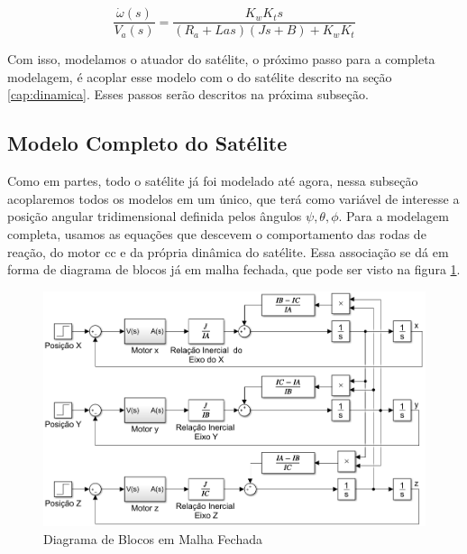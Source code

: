 \begin{equation}\label{eq:motor_accel}
  \frac{\dot{\omega}(s)}{V_a(s)} = \frac{K_wK_t s}{(R_a+ Las)(Js+B)+K_wK_t}  
\end{equation}

Com isso, modelamos o atuador do satélite, o próximo passo para a completa modelagem, é acoplar esse modelo com o do satélite descrito na seção \ref{cap:dinamica}. Esses passos serão descritos na próxima subseção.



\subsection{Modelo Completo do Satélite}

Como em partes, todo o satélite já foi modelado até agora, nessa subseção acoplaremos todos os modelos em um único, que terá como variável de interesse a posição angular tridimensional definida pelos ângulos $\psi, \theta, \phi$. Para a modelagem completa, usamos as equações que descevem o comportamento das rodas de reação, do motor cc e da própria dinâmica do satélite. Essa associação se dá em forma de diagrama de blocos já em malha fechada, que pode ser visto na figura \ref{fig:simulink_modelo_completo_aberto}.

\begin{figure}[H]
  \caption{Diagrama de Blocos em Malha Fechada}
  \begin{center}
      \includegraphics[scale=.6]{metodologia/img/simulink_modelo_completo_aberto}
  \end{center}
  \label{fig:simulink_modelo_completo_aberto}
\end{figure}

